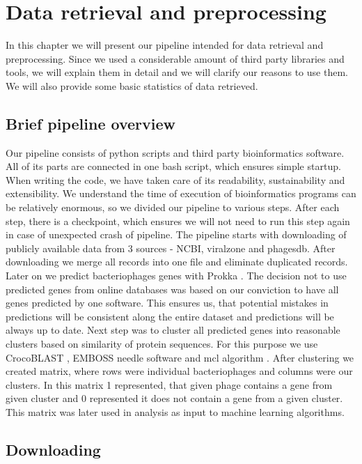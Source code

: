 \chapter{Data retrieval and preprocessing}
In this chapter we will present our pipeline intended for data retrieval and preprocessing.
Since we used a considerable amount of third party libraries and tools, we will explain them in detail and we will clarify our reasons to use them.
We will also provide some basic statistics of data retrieved.

\section{Brief pipeline overview}
Our pipeline consists of python scripts and third party bioinformatics software.
All of its parts are connected in one bash script, which ensures simple startup.
When writing the code, we have taken care of its readability, sustainability and extensibility.
We understand the time of execution of bioinformatics programs can be relatively enormous, so we divided our pipeline to various steps.
After each step, there is a checkpoint, which ensures we will not need to run this step again in case of unexpected crash of pipeline.
The pipeline starts with downloading of publicly available data from 3 sources - NCBI, viralzone and phagesdb.
After downloading we merge all records into one file and eliminate duplicated records.
Later on we predict bacteriophages genes with Prokka \cite{prokka}.
The decision not to use predicted genes from online databases was based on our conviction to have all genes predicted by one software.
This ensures us, that potential mistakes in predictions will be consistent along the entire dataset and predictions will be always up to date.
Next step was to cluster all predicted genes into reasonable clusters based on similarity of protein sequences.
For this purpose we use CrocoBLAST \cite{crocoblast}, EMBOSS needle software \cite{needle} and mcl algorithm \cite{mcl}.
After clustering we created matrix, where rows were individual bacteriophages and columns were our clusters.
In this matrix 1 represented, that given phage contains a gene from given cluster and 0 represented it does not contain a gene from a given cluster.
This matrix was later used in analysis as input to machine learning algorithms.

\section{Downloading}

